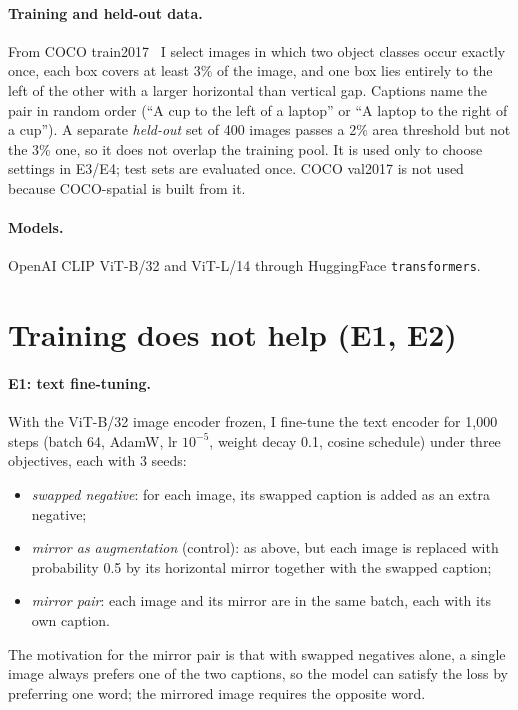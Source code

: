 \documentclass[10pt,twocolumn,letterpaper]{article}
\begin{document}
\paragraph{Training and held-out data.}
From COCO train2017~\cite{lin2014coco} I select images in which two object classes occur exactly once, each box covers at least 3\% of the image, and one box lies entirely to the left of the other with a larger horizontal than vertical gap.
Captions name the pair in random order (``A cup to the left of a laptop'' or ``A laptop to the right of a cup'').
A separate \emph{held-out} set of 400 images passes a 2\% area threshold but not the 3\% one, so it does not overlap the training pool.
It is used only to choose settings in E3/E4; test sets are evaluated once.
COCO val2017 is not used because COCO-spatial is built from it.

\paragraph{Models.}
OpenAI CLIP ViT-B/32 and ViT-L/14 through HuggingFace \texttt{transformers}.

\section{Training does not help (E1, E2)}
\label{sec:train}

\paragraph{E1: text fine-tuning.}
With the ViT-B/32 image encoder frozen, I fine-tune the text encoder for 1{,}000 steps (batch 64, AdamW, lr $10^{-5}$, weight decay 0.1, cosine schedule) under three objectives, each with 3 seeds:
\begin{itemize}
\setlength\itemsep{0pt}
\item \emph{swapped negative}: for each image, its swapped caption is added as an extra negative;
\item \emph{mirror as augmentation} (control): as above, but each image is replaced with probability 0.5 by its horizontal mirror together with the swapped caption;
\item \emph{mirror pair}: each image and its mirror are in the same batch, each with its own caption.
\end{itemize}
The motivation for the mirror pair is that with swapped negatives alone, a single image always prefers one of the two captions, so the model can satisfy the loss by preferring one word; the mirrored image requires the opposite word.
\end{document}
